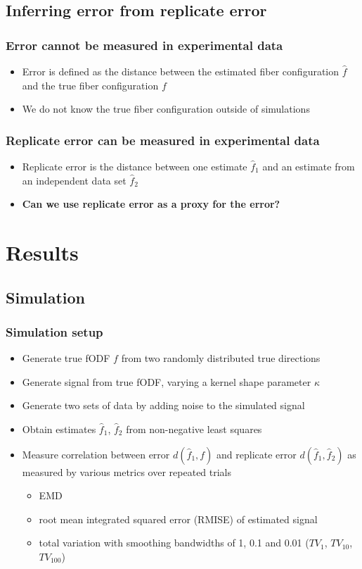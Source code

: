 \documentclass{beamer}
\begin{document}
\subsection{Inferring error from replicate error}
\begin{frame}
\frametitle{Error cannot be measured in experimental data}
\begin{itemize}
\item Error is defined as the distance between the estimated fiber configuration $\hat{f}$
and the true fiber configuration $f$
\item We do not know the true fiber configuration outside of simulations
\end{itemize}
\end{frame}

\begin{frame}
\frametitle{Replicate error can be measured in experimental data}
\begin{itemize}
\item Replicate error is the distance between one estimate $\hat{f}_1$ and an estimate from an independent data set $\hat{f}_2$
\item \textbf{Can we use replicate error as a proxy for the error?}
\end{itemize}
\end{frame}

\section{Results}

\subsection{Simulation}
\begin{frame}
\frametitle{Simulation setup}
\begin{itemize}
\item Generate true fODF $f$ from two randomly distributed true directions
\item Generate signal from true fODF, varying a kernel shape parameter $\kappa$
\item Generate two sets of data by adding noise to the simulated signal
\item Obtain estimates $\hat{f}_1$, $\hat{f}_2$ from non-negative least squares
\item Measure correlation between error $d(\hat{f}_1,f)$ and
  replicate error $d(\hat{f}_1,\hat{f}_2)$ as measured by various metrics
  over repeated trials
\begin{itemize} 
\item EMD
\item root mean integrated squared error (RMISE) of estimated signal
\item total variation with smoothing bandwidths of 1, 0.1 and 0.01
  ($TV_1$, $TV_{10}$, $TV_{100}$)\end{itemize}
\end{itemize}
\end{frame}
\end{document}
